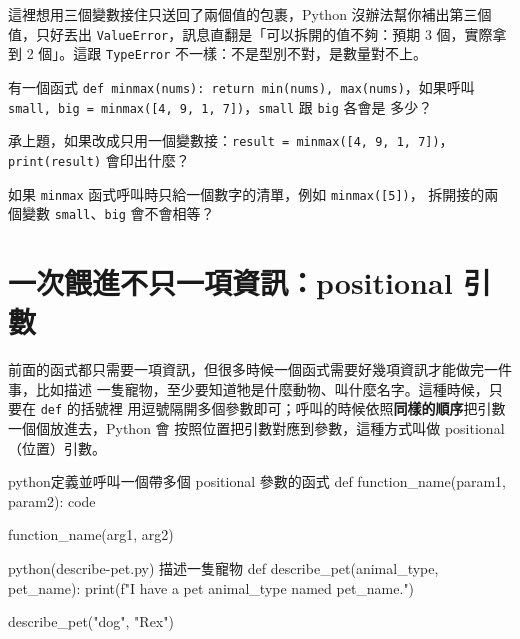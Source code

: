 這裡想用三個變數接住只送回了兩個值的包裹，Python 沒辦法幫你補出第三個值，只好丟出
\texttt{ValueError}，訊息直翻是「可以拆開的值不夠：預期 3 個，實際拿到 2 個」。這跟
\texttt{TypeError} 不一樣：不是型別不對，是數量對不上。


\begin{drills}[label=drills:function-multi-return]
\item 有一個函式 \texttt{def minmax(nums): return min(nums), max(nums)}，如果呼叫
\texttt{small, big = minmax([4, 9, 1, 7])}，\texttt{small} 跟 \texttt{big} 各會是
多少？
\item 承上題，如果改成只用一個變數接：\texttt{result = minmax([4, 9, 1, 7])}，
\texttt{print(result)} 會印出什麼？
\item 如果 \texttt{minmax} 函式呼叫時只給一個數字的清單，例如 \texttt{minmax([5])}，
拆開接的兩個變數 \texttt{small}、\texttt{big} 會不會相等？
\end{drills}

\section{一次餵進不只一項資訊：positional 引數}
\label{sec:function-positional}

前面的函式都只需要一項資訊，但很多時候一個函式需要好幾項資訊才能做完一件事，比如描述
一隻寵物，至少要知道牠是什麼動物、叫什麼名字。這種時候，只要在 \texttt{def} 的括號裡
用逗號隔開多個參數即可；呼叫的時候依照\textbf{同樣的順序}把引數一個個放進去，Python 會
按照位置把引數對應到參數，這種方式叫做 positional（位置）引數。

\begin{code}{python}{定義並呼叫一個帶多個 positional 參數的函式}
def function_name(param1, param2):
    code

function_name(arg1, arg2)
\end{code}

\begin{example}{python}{(describe-pet.py) 描述一隻寵物}
def describe_pet(animal_type, pet_name):
    print(f"I have a pet {animal_type} named {pet_name}.")


describe_pet("dog", "Rex")
\end{example}

